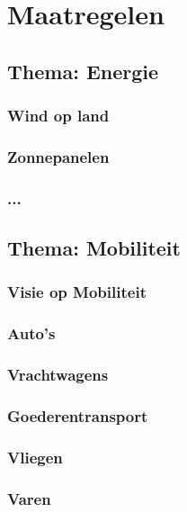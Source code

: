 \part{Maatregelen}

\chapter{Thema: Energie}




\section{Wind op land}
\section{Zonnepanelen}
\section{...}



   


\chapter{Thema: Mobiliteit}
\section*{Visie op Mobiliteit}
\section{Auto's}
\section{Vrachtwagens}
\section{Goederentransport}
\section{Vliegen}
\section{Varen}
